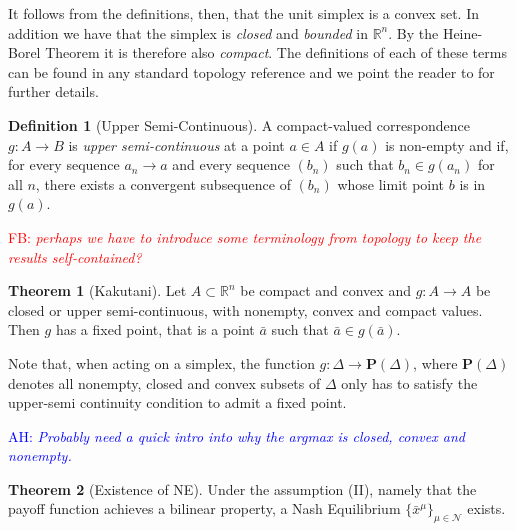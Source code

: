 \documentclass{article}
\theoremstyle{definition}
\newtheorem{definition}{Definition}
\newtheorem{theorem}{Theorem}
\newcommand{\ah}[1]{\textcolor{blue}{AH: \textit{#1}}}
\newcommand{\fb}[1]{\textcolor{red}{FB: \textit{#1}}}
\newcommand{\agentset}{\mathcal{N}}
\begin{document}
	It follows from the definitions, then, that the unit simplex is a convex set. In addition we have that the simplex is \emph{closed} and \emph{bounded} in $\mathbb{R}^n$. By the Heine-Borel Theorem \cite{Royden} it is therefore also \emph{compact}. The definitions of each of these terms can be found in any standard topology reference and we point the reader to \cite{Royden} for further details.

  \begin{definition}[Upper Semi-Continuous] 
    A compact-valued correspondence $g: A \rightarrow B$ is
    \emph{upper semi-continuous} \cite{Findforthis} at a point $a \in A$ if $g(a)$ is non-empty
    and if, for every sequence $a_n \rightarrow a$ and every sequence
    $(b_n)$ such that $b_n \in g(a_n)$ for all $n$, there exists a
    convergent subsequence of $(b_n)$ whose limit point $b$ is in
    $g(a)$.
  \end{definition}

  \fb{perhaps we have to introduce some terminology from topology to keep the results self-contained?}

  \begin{theorem}[Kakutani] 
    Let $A \subset \mathbb{R}^n$ be compact and convex and $g: A \rightarrow A$ be closed or upper semi-continuous, with nonempty, convex and compact values. Then $g$ has a fixed point, that is a point $\bar{a}$ such that $\bar{a} \in g(\bar{a})$. \cite{Kakutani}
  \end{theorem}

  Note that, when acting on a simplex, the function $g: \Delta \rightarrow \textbf{P}(\Delta)$, where $\textbf{P}(\Delta)$ denotes all nonempty, closed and convex subsets of $\Delta$ only has to satisfy the upper-semi continuity condition to admit a fixed point.

	\ah{Probably need a quick intro into why the argmax is closed, convex and nonempty.}

  \begin{theorem}[Existence of NE]
    Under the assumption (II), namely that the payoff function achieves a bilinear property, a
    Nash Equilibrium $\{\bar{x}^\mu\}_{\mu \in \agentset}$ exists.
  \end{theorem}
\end{document}
